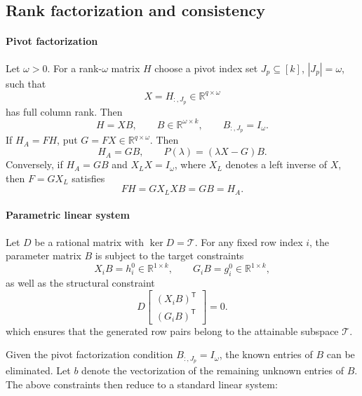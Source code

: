 \documentclass[journal]{IEEEtran}
\theoremstyle{plainn}
\theoremstyle{remark}
\begin{document}
\subsection{Rank factorization and consistency}\label{sec:consistency}

\paragraph*{Pivot factorization}\label{sec:pivot}
Let $\omega>0$. For a rank-$\omega$ matrix $H$ choose a pivot index set
$J_{p}\subseteq[k]$, $|J_{p}|=\omega$, such that
\begin{equation*}
X=H_{:,J_{p}}\in\mathbb R^{q\times\omega}
\end{equation*}
has full column rank. Then
\begin{equation*}
H=XB,\qquad B\in\mathbb R^{\omega\times k},\qquad B_{:,J_p}=I_\omega .
\end{equation*}
If $H_A=FH$, put $G=FX\in\mathbb R^{q\times\omega}$.
Then
\begin{equation*}
H_A=GB,\qquad P(\lambda)=(\lambda X-G)B .
\end{equation*}
Conversely, if $H_A=GB$ and $X_LX=I_\omega$, where $X_L$ denotes a left
inverse of $X$, then $F=GX_L$ satisfies
\begin{equation*}
FH=GX_LXB=GB=H_A .
\end{equation*}

\paragraph*{Parametric linear system}\label{sec:param}
Let $D$ be a rational matrix with $\ker D=\mathcal T$. For any fixed row index 
$i$, the parameter matrix $B$ is subject to the target constraints
\begin{equation*}
X_iB=h_i^0\in\mathbb R^{1\times k},\qquad G_iB=g_i^0\in\mathbb R^{1\times k},
\end{equation*}
as well as the structural constraint
\begin{equation*}
D\begin{bmatrix}(X_iB)^{\mathsf T}\\ (G_iB)^{\mathsf T}\end{bmatrix}=0.
\end{equation*}
which ensures that the generated row pairs belong to the attainable subspace $\mathcal T$.

Given the pivot factorization condition $B_{:,J_p}=I_\omega$, the known entries of 
$B$ can be eliminated. Let $b$ denote the vectorization of the remaining unknown entries of $B$. The above constraints then reduce to a standard linear system:
\end{document}
